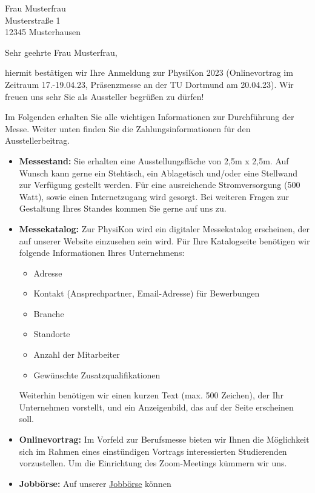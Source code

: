 \documentclass[
  pepbrief,
  fontsize=12pt,
  paper=a4,
  DIV=14,
  parskip=half,
  backaddress=false,
]{scrlttr2}
\author{Netter PhysiKon Helfer}
\begin{document}
\begin{letter}{%
  Frau Musterfrau \\
  Musterstraße 1 \\
  12345 Musterhausen
}
\opening{Sehr geehrte Frau Musterfrau,}
hiermit bestätigen wir Ihre Anmeldung zur PhysiKon 2023 (Onlinevortrag im Zeitraum 17.-19.04.23, 
Präsenzmesse an der TU Dortmund am 20.04.23). 
Wir freuen uns sehr Sie als Aussteller begrüßen zu dürfen!

Im Folgenden erhalten Sie alle wichtigen Informationen zur Durchführung der Messe. Weiter unten finden Sie 
die Zahlungsinformationen für den Ausstellerbeitrag. 

\begin{itemize}
  \item \textbf{Messestand:} Sie erhalten eine Ausstellungsfläche von 2,5m x 2,5m.
    Auf Wunsch kann gerne ein Stehtisch, ein Ablagetisch und/oder eine Stellwand 
    zur Verfügung gestellt werden.
    Für eine ausreichende Stromversorgung (500 Watt), sowie einen Internetzugang wird gesorgt.
    Bei weiteren Fragen zur Gestaltung Ihres Standes kommen Sie gerne auf uns zu.
    \item \textbf{Messekatalog:} Zur PhysiKon wird ein digitaler Messekatalog erscheinen, der auf unserer Website 
    einzusehen sein wird.
    Für Ihre Katalogseite benötigen wir folgende Informationen Ihres Unternehmens:
    \begin{itemize}
      \item Adresse
      \item Kontakt (Ansprechpartner, Email-Adresse) für Bewerbungen
      \item Branche
      \item Standorte
      \item Anzahl der Mitarbeiter
      \item Gewünschte Zusatzqualifikationen
    \end{itemize}
    Weiterhin benötigen wir einen kurzen Text (max. 500 Zeichen), der Ihr Unternehmen vorstellt, 
    und ein Anzeigenbild, 
    das auf der Seite erscheinen soll.
    \item \textbf{Onlinevortrag:} Im Vorfeld zur Berufsmesse bieten wir Ihnen die Möglichkeit sich im Rahmen eines einstündigen Vortrags interessierten
    Studierenden vorzustellen. Um die Einrichtung des Zoom-Meetings kümmern wir uns. 
    \item \textbf{Jobbörse:} Auf unserer \href{https://pep-dortmund.org/jobboerse/}{Jobbörse} können 

\end{itemize}
\end{letter}
\end{document}
